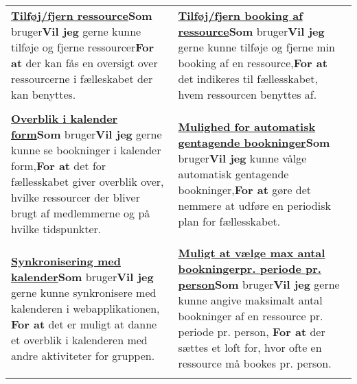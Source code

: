 \begin{tabular}{p{2.5in}p{2.5in}}
\textbf{\underline{Tilføj/fjern ressource}}\newline \textbf{Som} bruger\newline \textbf{Vil jeg} gerne kunne tilføje og fjerne ressourcer\newline \textbf{For at} der kan fås en oversigt over ressourcerne i fælleskabet der kan benyttes. & \textbf{\underline{Tilføj/fjern booking af ressource}}\newline \textbf{Som} bruger\newline \textbf{Vil jeg} gerne kunne tilføje og fjerne min booking af en ressource,\newline \textbf{For at} det indikeres til fællesskabet, hvem ressourcen benyttes af.  \\\\
\textbf{\underline{Overblik i kalender form}}\newline \textbf{Som} bruger\newline \textbf{Vil jeg} gerne kunne se bookninger i kalender form,\newline \textbf{For at} det for fællesskabet giver overblik over, hvilke ressourcer der bliver brugt af medlemmerne og på hvilke tidspunkter.  & \textbf{\underline{Mulighed for automatisk gentagende bookninger}}\newline \textbf{Som} bruger\newline \textbf{Vil jeg} kunne vålge automatisk gentagende bookninger,\newline \textbf{For at} gøre det nemmere at udføre en periodisk plan for fællesskabet.  \\\\  
\textbf{\underline{Synkronisering med kalender}}\newline \textbf{Som} bruger\newline \textbf{Vil jeg} gerne kunne synkronisere med kalenderen i webapplikationen, \newline \textbf{For at} det er muligt at danne et overblik i kalenderen med andre aktiviteter for gruppen.  & 
\textbf{\underline{Muligt at vælge max antal bookninger}}\newline \textbf{\underline{pr. periode pr. person}}\newline \textbf{Som} bruger\newline \textbf{Vil jeg} gerne kunne angive maksimalt antal bookninger af en ressource pr. periode pr. person, \newline\textbf{For at} der sættes et loft for, hvor ofte en ressource må bookes pr. person.  \\\\

\end{tabular}
